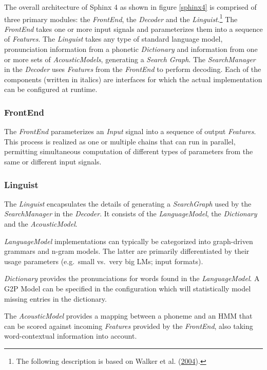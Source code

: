 \documentclass[]{article}
\begin{document}
The overall architecture of Sphinx 4 as shown in figure \ref{sphinx4} is
comprised of three primary modules: the \emph{FrontEnd}, the
\emph{Decoder} and the \emph{Linguist}.\footnote{The following
  description is based on Walker et al.
  (\hyperref[ref-whitepaper]{2004}).} The \emph{FrontEnd} takes one or
more input signals and parameterizes them into a sequence of
\emph{Features}. The \emph{Linguist} takes any type of standard language
model, pronunciation information from a phonetic \emph{Dictionary} and
information from one or more sets of \emph{AcousticModels}, generating a
\emph{Search Graph}. The \emph{SearchManager} in the \emph{Decoder} uses
\emph{Features} from the \emph{FrontEnd} to perform decoding. Each of
the components (written in italics) are interfaces for which the actual
implementation can be configured at runtime.

\subsubsection{FrontEnd}\label{frontend}

The \emph{FrontEnd} parameterizes an \emph{Input} signal into a sequence
of output \emph{Features}. This process is realized as one or multiple
chains that can run in parallel, permitting simultaneous computation of
different types of parameters from the same or different input signals.

\subsubsection{Linguist}\label{linguist}

The \emph{Linguist} encapsulates the details of generating a
\emph{SearchGraph} used by the \emph{SearchManager} in the
\emph{Decoder}. It consists of the \emph{LanguageModel}, the
\emph{Dictionary} and the \emph{AcousticModel}.

\emph{LanguageModel} implementations can typically be categorized into
graph-driven grammars and n-gram models. The latter are primarily
differentiated by their usage parameters (e.g.~small vs.~very big LMs;
input formats).

\emph{Dictionary} provides the pronunciations for words found in the
\emph{LanguageModel}. A G2P Model can be specified in the configuration
which will statistically model missing entries in the dictionary.

The \emph{AcousticModel} provides a mapping between a phoneme and an HMM
that can be scored against incoming \emph{Features} provided by the
\emph{FrontEnd}, also taking word-contextual information into account.
\end{document}
